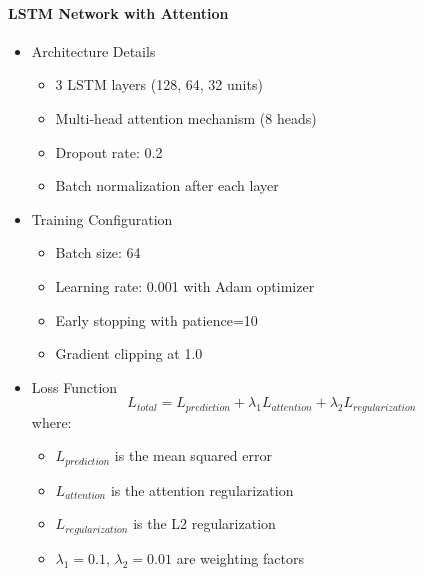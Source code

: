 \documentclass[conference]{IEEEtran}
\begin{document}
\paragraph{LSTM Network with Attention}
\begin{itemize}
    \item Architecture Details
    \begin{itemize}
        \item 3 LSTM layers (128, 64, 32 units)
        \item Multi-head attention mechanism (8 heads)
        \item Dropout rate: 0.2
        \item Batch normalization after each layer
    \end{itemize}
    
    \item Training Configuration
    \begin{itemize}
        \item Batch size: 64
        \item Learning rate: 0.001 with Adam optimizer
        \item Early stopping with patience=10
        \item Gradient clipping at 1.0
    \end{itemize}
    
    \item Loss Function
    \begin{equation}
    L_{total} = L_{prediction} + \lambda_1 L_{attention} + \lambda_2 L_{regularization}
    \end{equation}
    where:
    \begin{itemize}
        \item $L_{prediction}$ is the mean squared error
        \item $L_{attention}$ is the attention regularization
        \item $L_{regularization}$ is the L2 regularization
        \item $\lambda_1 = 0.1$, $\lambda_2 = 0.01$ are weighting factors
    \end{itemize}
\end{itemize}
\end{document}
